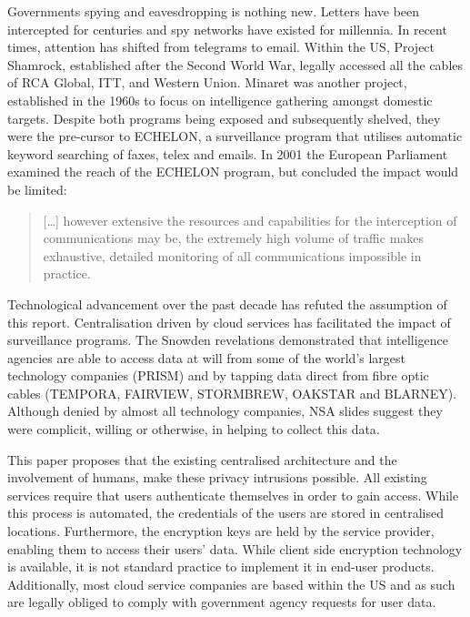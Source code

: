 \documentclass[twocolumn,english]{article}
\begin{document}
Governments spying and eavesdropping is nothing new\cite{bbc13}. Letters have been intercepted for centuries and spy networks have existed for millennia. In recent times, attention has shifted from
telegrams to email. Within the US, Project Shamrock, established after
the Second World War, legally accessed all the cables of RCA Global,
ITT, and Western Union. Minaret was another project, established in
the 1960s to focus on intelligence gathering amongst domestic targets. Despite both programs being exposed and subsequently shelved, they
were the pre-cursor to ECHELON, a surveillance program that utilises automatic
keyword searching of faxes, telex and emails.  In 2001 the European Parliament examined the reach of the ECHELON program, but concluded the impact would be limited\cite{Schmid01}: 
\begin{quote}
[\dots] however extensive the resources and capabilities for the interception of communications may be, the extremely high volume of traffic makes exhaustive, detailed monitoring of all communications impossible in practice.
\end{quote}
 
Technological advancement over the past decade has refuted the assumption of this report.  Centralisation driven by cloud services has facilitated the impact of surveillance programs. The Snowden revelations demonstrated that
intelligence agencies are able to access data at will from some of
the world\textquoteright s largest technology companies (PRISM) and
by tapping data direct from fibre optic cables (TEMPORA, FAIRVIEW,
STORMBREW, OAKSTAR and BLARNEY)\cite{guardianNSA}. Although denied by almost all technology companies, NSA slides suggest
they were complicit, willing or otherwise, in helping to collect this
data\cite{guardian13}.

This paper proposes that the existing centralised architecture and the involvement of humans, make these privacy
intrusions possible. All existing services require that users authenticate themselves in order to gain access.  While this process is automated, the credentials
of the users are stored in centralised locations. Furthermore, the
encryption keys are held by the service provider, enabling them to
access their users' data\cite{lambert12}. While client side encryption technology is available, it is not standard practice to implement it in end-user products. Additionally, most cloud service companies are based within the US and as such are legally obliged to comply with government agency
requests for user data.
\end{document}

